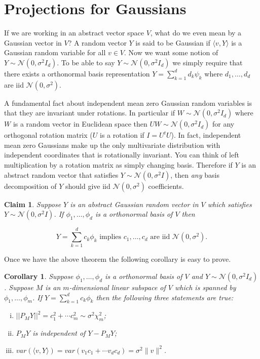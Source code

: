 \documentclass[11pt]{report}
\newtheorem{claim}{Claim}
\newtheorem{corollary}{Corollary}
\begin{document}
\section{Projections for Gaussians}


If we are working in an abstract vector space $V$, what do we even mean by a Gaussian vector in $V$? A random vector $Y$ is said to be Gaussian if $\langle v,Y\rangle$ is a Gaussian random variable for all $v\in V$. Now we want some notion of $Y\sim \mathcal N(0,\sigma^2 I_d)$. To be able to say $Y\sim \mathcal N(0,\sigma^2 I_d)$ we simply require that there exists a orthonormal basis representation $Y= \sum_{k=1}^d d_k \psi_k$ where $d_1,\ldots, d_d$ are iid $\mathcal N(0,\sigma^2)$. 

A fundamental fact about independent mean zero Gaussian random variables is that they are invariant under rotations. In particular if $W \sim \mathcal N\left(0, \sigma^2 I_d\right)$ where $W$ is a random vector in Euclidean space then $UW \sim \mathcal N\left(0, \sigma^2I_d\right)$ for any orthogonal rotation matrix ($U$ is a rotation if  $I = U^{t}U$). In fact, independent mean zero Gaussians make up the only multivariate distribution with independent coordinates that is rotationally invariant. 
You can think of left multiplication by a rotation matrix as simply changing basis. Therefore if  $Y$ is an abstract random vector that satisfies $Y\sim \mathcal N(0,\sigma^2 I)$, then {\em any} basis decomposition of $Y$ should give iid $\mathcal N(0,\sigma^2)$ coefficients. 

\begin{claim}
Suppose $Y$ is an abstract Gaussian random vector in $V$ which satisfies $Y\sim \mathcal N(0,\sigma^2 I)$. If $\phi_1,\ldots, \phi_d$ is a orthonormal basis of $V$ then 
 
 \[ 
 \boxed{Y = \sum_{k=1}^d c_k \phi_k \text{ implies } c_1,\ldots, c_d \text{ are iid $\mathcal N(0,\sigma^2)$.}}
 \]
\end{claim}

Once we have the above theorem the following corollary is easy to prove.

\begin{corollary}
Suppose $\phi_1,\ldots, \phi_d$ is a orthonormal basis of $V$ and $Y\sim \mathcal N(0,\sigma^2 I_d)$. Suppose $M$ is an $m$-dimensional linear subspace of $V$ which is spanned by $\phi_1,\ldots, \phi_m$. If $Y = \sum_{k=1}^d c_k \phi_k$ then the following three statements are true:
\begin{enumerate}[(i)]
\item $||P_MY||^2 = c_1^2+\cdots c_m^2 \sim \sigma^2 \chi^2_m$;
\item $P_MY$ is independent of  $Y-P_MY$;
\item $var(\langle v,Y\rangle) = var( v_1 c_1+\cdots v_dc_d) =  \sigma^2 \| v \|^2$.
\end{enumerate}
\end{corollary}
\end{document}
